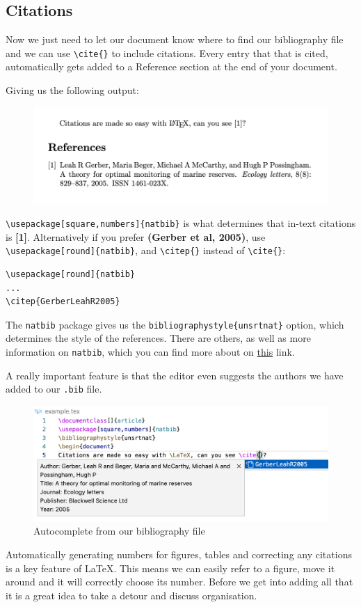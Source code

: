 \subsection{Citations}
Now we just need to let our document know where to find our bibliography file and we can use \verb|\cite{}| to include citations.
Every entry that that is cited, automatically gets added to a Reference section at the end of your document.


Giving us the following output:
\begin{figure}[h]
  \centering
    \includegraphics[]{figures/references.png}
  \label{fig:references}
\end{figure}

\verb|\usepackage[square,numbers]{natbib}| is what determines that in-text citations is \textbf{[1]}.
Alternatively if you prefer \textbf{(Gerber et al, 2005)}, use \verb|\usepackage[round]{natbib}|, and \verb|\citep{}| instead of \texttt{\textbackslash cite\{\}}:
\begin{lstlisting}
\usepackage[round]{natbib}
...
\citep{GerberLeahR2005}
\end{lstlisting}

The \verb|natbib| package gives us the \verb|bibliographystyle{unsrtnat}| option, which determines the style of the references.
There are others, as well as more information on \verb|natbib|, which you can find more about on \href{https://ftp.eq.uc.pt/software/TeX/macros/latex/contrib/natbib/natnotes.pdf}{this} link. 

A really important feature is that the editor even suggests the authors we have added to our \verb|.bib| file.
\begin{figure}[h]
  \centering
  \includegraphics[width=\textwidth]{figures/intellisense.png}
  \caption{Autocomplete from our bibliography file}
  \label{fig:intellisense}
\end{figure}

Automatically generating numbers for figures, tables and correcting any citations is a key feature of \LaTeX.
This means we can easily refer to a figure, move it around and it will correctly choose its number.
Before we get into adding all that it is a great idea to take a detour and discuss organisation.